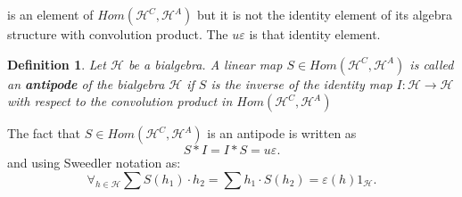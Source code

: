 \documentclass[a4paper, 12pt]{report}
\newtheorem{definition}{Definition}
\begin{document}
is an
element of $Hom(\mathcal{H}^C, \mathcal{H}^A)$ but it is not the identity element of its algebra structure
with convolution product. The $u\varepsilon$ is that identity element.
\begin{definition}
Let $\mathcal{H}$ be a bialgebra. A linear map $S \in Hom(\mathcal{H}^C, \mathcal{H}^A)$ is called an
\textbf{antipode} of the bialgebra $\mathcal{H}$ if $S$ is the inverse of the identity map
$I : \mathcal{H} \to \mathcal{H}$ with respect to the convolution product in
$Hom(\mathcal{H}^C, \mathcal{H}^A)$
\end{definition}
The fact that $S \in Hom(\mathcal{H}^C, \mathcal{H}^A)$ is an antipode is written as
\begin{equation*}
S * I = I * S = u\varepsilon.
\end{equation*}
and using Sweedler notation as:
\begin{equation*}
\forall_{h \in \mathcal{H}} \sum S(h_1) \cdot h_2 = \sum h_1 \cdot S(h_2) = \varepsilon(h)1_\mathcal{H}.
\end{equation*}
\end{document}

